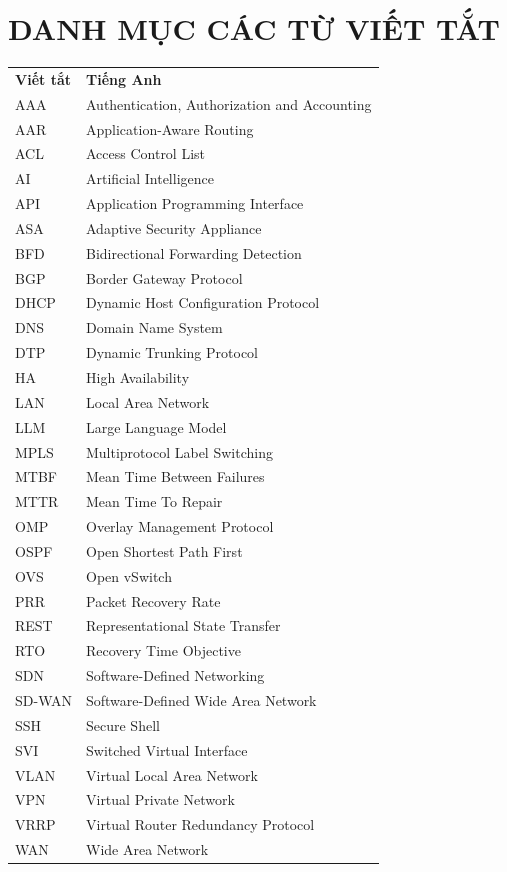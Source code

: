 \newpage
\section*{DANH MỤC CÁC TỪ VIẾT TẮT}

{
\renewcommand{\arraystretch}{1.3}
\begin{longtable}{ >{\centering\arraybackslash}p{3cm} p{9cm} }
    \textbf{Viết tắt} & \textbf{Tiếng Anh} \\

    AAA & Authentication, Authorization and Accounting \\
    AAR & Application-Aware Routing \\
    ACL & Access Control List \\
    AI & Artificial Intelligence \\
    API & Application Programming Interface \\
    ASA & Adaptive Security Appliance \\
    BFD & Bidirectional Forwarding Detection \\
    BGP & Border Gateway Protocol \\
    DHCP & Dynamic Host Configuration Protocol \\
    DNS & Domain Name System \\
    DTP & Dynamic Trunking Protocol \\
    HA & High Availability \\
    LAN & Local Area Network \\
    LLM & Large Language Model \\
    MPLS & Multiprotocol Label Switching \\
    MTBF & Mean Time Between Failures \\
    MTTR & Mean Time To Repair \\
    OMP & Overlay Management Protocol \\
    OSPF & Open Shortest Path First \\
    OVS & Open vSwitch \\
    PRR & Packet Recovery Rate \\
    REST & Representational State Transfer \\
    RTO & Recovery Time Objective \\
    SDN & Software-Defined Networking \\
    SD-WAN & Software-Defined Wide Area Network \\
    SSH & Secure Shell \\
    SVI & Switched Virtual Interface \\
    VLAN & Virtual Local Area Network \\
    VPN & Virtual Private Network \\
    VRRP & Virtual Router Redundancy Protocol \\
    WAN & Wide Area Network \\
\end{longtable}
}
